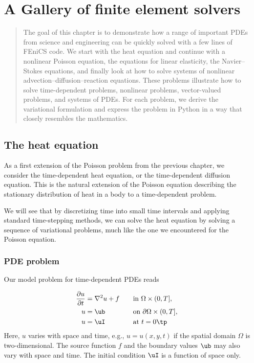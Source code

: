 \documentclass[graybox,envcountchap,sectrefs,final]{svmonodo}
\begin{document}
\chapter{A Gallery of finite element solvers}
\label{ch:gallery}


\begin{quote}
The goal of this chapter is to demonstrate how a range of important
PDEs from science and engineering can be quickly solved with a few
lines of FEniCS code. We start with the heat equation and continue
with a nonlinear Poisson equation, the equations for linear
elasticity, the Navier--Stokes equations, and finally look at how to
solve systems of nonlinear advection--diffusion--reaction
equations. These problems illustrate how to solve time-dependent
problems, nonlinear problems, vector-valued problems, and systems of
PDEs. For each problem, we derive the variational formulation and
express the problem in Python in a way that closely resembles the
mathematics.
\end{quote}



\section{The heat equation}
\label{ch:fundamentals:diffusion}


As a first extension of the Poisson problem from the previous chapter,
we consider the time-dependent heat equation, or the time-dependent
diffusion equation. This is the natural extension of the Poisson
equation describing the stationary distribution of heat in a body to a
time-dependent problem.

We will see that by discretizing time into small time intervals and
applying standard time-stepping methods, we can solve the heat
equation by solving a sequence of variational problems, much like the
one we encountered for the Poisson equation.

\subsection{PDE problem}

Our model problem for time-dependent PDEs reads

\begin{alignat}{2}
{\partial u\over\partial t} &= \nabla^2 u + f \quad &&\hbox{in }\Omega\times(0, T],
\label{ch:diffusion0:pde1}\\
u &= \ub &&\hbox{on } \partial \Omega\times(0, T],
\label{ch:diffusion0:pde1:bc}\\
u &= \uI &&\mbox{at } t=0\tp
\label{ch:diffusion0:pde1:ic}
\end{alignat}
Here, $u$ varies with space and time, e.g., $u=u(x,y,t)$ if the spatial
domain $\Omega$ is two-dimensional. The source function $f$ and the
boundary values $\ub$ may also vary with space and time.
The initial condition $\uI$ is a function of space only.
\end{document}
